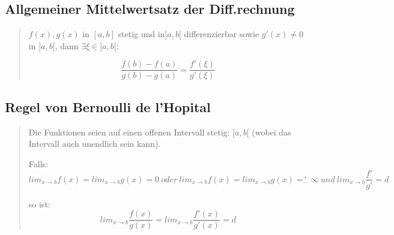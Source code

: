 \subsection*{Allgemeiner Mittelwertsatz der Diff.rechnung}
\begin{quote}
$f(x),g(x)$ in $[a,b]$ stetig und in$]a,b[$ differenzierbar sowie
$g'(x)\neq0$ in $]a,b[$, dann $\exists\xi\in]a,b[$:

\[
\frac{f(b)-f(a)}{g(b)-g(a)}=\frac{f'(\xi)}{g'(\xi)}
\]

\end{quote}

\subsection*{Regel von Bernoulli de l'Hopital}
\begin{quote}
Die Funktionen seien auf einen offenen Intervall stetig: $]a,b[$
(wobei das Intervall auch unendlich sein kann).

Falls:
\[
lim_{x\rightarrow b}f(x)=lim_{x\rightarrow b}g(x)=0\: oder\: lim_{x\rightarrow b}f(x)=lim_{x\rightarrow b}g(x)=_{-}^{+}\infty\: und\: lim_{x\rightarrow b}\frac{f'}{g'}=d
\]


so ist: 
\[
lim_{x\rightarrow b}\frac{f(x)}{g(x)}=lim_{x\rightarrow b}\frac{f'(x)}{g'(x)}=d
\]
\end{quote}

